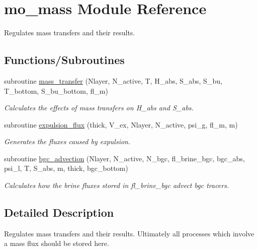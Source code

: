 \hypertarget{namespacemo__mass}{
\section{mo\_\-mass Module Reference}
\label{namespacemo__mass}
}


Regulates mass transfers and their results.  


\subsection*{Functions/Subroutines}
\begin{DoxyCompactItemize}
\item 
subroutine \hyperlink{namespacemo__mass_a41bcbec215f56133154de8249421c5cf}{mass\_\-transfer} (Nlayer, N\_\-active, T, H\_\-abs, S\_\-abs, S\_\-bu, T\_\-bottom, S\_\-bu\_\-bottom, fl\_\-m)
\begin{DoxyCompactList}\small\item\em Calculates the effects of mass transfers on H\_\-abs and S\_\-abs. \item\end{DoxyCompactList}\item 
subroutine \hyperlink{namespacemo__mass_a6e8bfe7e768a83a31407eb4771b1fead}{expulsion\_\-flux} (thick, V\_\-ex, Nlayer, N\_\-active, psi\_\-g, fl\_\-m, m)
\begin{DoxyCompactList}\small\item\em Generates the fluxes caused by expulsion. \item\end{DoxyCompactList}\item 
subroutine \hyperlink{namespacemo__mass_aafe4d8270d3f10cd77b9622b40d6da8a}{bgc\_\-advection} (Nlayer, N\_\-active, N\_\-bgc, fl\_\-brine\_\-bgc, bgc\_\-abs, psi\_\-l, T, S\_\-abs, m, thick, bgc\_\-bottom)
\begin{DoxyCompactList}\small\item\em Calculates how the brine fluxes stored in fl\_\-brine\_\-bgc advect bgc tracers. \item\end{DoxyCompactList}\end{DoxyCompactItemize}


\subsection{Detailed Description}
Regulates mass transfers and their results. Ultimately all processes which involve a mass flux should be stored here.

